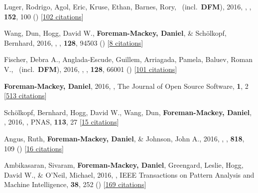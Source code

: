 \item[{\color{numcolor}\scriptsize20}] Luger, Rodrigo, Agol, Eric, Kruse, Ethan, Barnes, Rory, \etal\ (incl.\ \textbf{DFM}), 2016, , \aj, \textbf{152}, 100 () [\href{http://adsabs.harvard.edu/abs/2016AJ....152..100L}{102 citations}]

\item[{\color{numcolor}\scriptsize19}] Wang, Dun, Hogg, David W., \textbf{Foreman-Mackey, Daniel}, \& Sch{\"o}lkopf, Bernhard, 2016, , \pasp, \textbf{128}, 94503 () [\href{http://adsabs.harvard.edu/abs/2016PASP..128i4503W}{8 citations}]

\item[{\color{numcolor}\scriptsize18}] Fischer, Debra A., Anglada-Escude, Guillem, Arriagada, Pamela, Baluev, Roman V., \etal\ (incl.\ \textbf{DFM}), 2016, , \pasp, \textbf{128}, 66001 () [\href{http://adsabs.harvard.edu/abs/2016PASP..128f6001F}{101 citations}]

\item[{\color{numcolor}\scriptsize17}] \textbf{Foreman-Mackey, Daniel}, 2016, , The Journal of Open Source Software, \textbf{1}, 2 [\href{https://scholar.google.com/scholar?cites=1835087844145558435,9294978791003210998,17836006976722650130,12820425635803494730}{513 citations}]

\item[{\color{numcolor}\scriptsize16}] Sch{\"o}lkopf, Bernhard, Hogg, David W., Wang, Dun, \textbf{Foreman-Mackey, Daniel}, \etal, 2016, , PNAS, \textbf{113}, 27 [\href{https://scholar.google.com/scholar?cites=2429561747341807338}{15 citations}]

\item[{\color{numcolor}\scriptsize15}] Angus, Ruth, \textbf{Foreman-Mackey, Daniel}, \& Johnson, John A., 2016, , \apj, \textbf{818}, 109 () [\href{http://adsabs.harvard.edu/abs/2016ApJ...818..109A}{16 citations}]

\item[{\color{numcolor}\scriptsize14}] Ambikasaran, Sivaram, \textbf{Foreman-Mackey, Daniel}, Greengard, Leslie, Hogg, David W., \& O'Neil, Michael, 2016, , IEEE Transactions on Pattern Analysis and Machine Intelligence, \textbf{38}, 252 () [\href{https://scholar.google.com/scholar?cites=4840899390891567426,9641158393712381489}{169 citations}]


